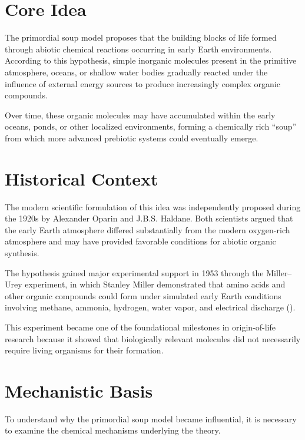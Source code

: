 \documentclass[
  oneside]{book}
\begin{document}
\section{Core Idea}\label{core-idea}

The primordial soup model proposes that the building blocks of life formed through abiotic chemical reactions occurring in early Earth environments. According to this hypothesis, simple inorganic molecules present in the primitive atmosphere, oceans, or shallow water bodies gradually reacted under the influence of external energy sources to produce increasingly complex organic compounds.

Over time, these organic molecules may have accumulated within the early oceans, ponds, or other localized environments, forming a chemically rich ``soup'' from which more advanced prebiotic systems could eventually emerge.

\section{Historical Context}\label{historical-context}

The modern scientific formulation of this idea was independently proposed during the 1920s by Alexander Oparin and J.B.S. Haldane. Both scientists argued that the early Earth atmosphere differed substantially from the modern oxygen-rich atmosphere and may have provided favorable conditions for abiotic organic synthesis.

The hypothesis gained major experimental support in 1953 through the Miller--Urey experiment, in which Stanley Miller demonstrated that amino acids and other organic compounds could form under simulated early Earth conditions involving methane, ammonia, hydrogen, water vapor, and electrical discharge ().

This experiment became one of the foundational milestones in origin-of-life research because it showed that biologically relevant molecules did not necessarily require living organisms for their formation.

\section{Mechanistic Basis}\label{mechanistic-basis}

To understand why the primordial soup model became influential, it is necessary to examine the chemical mechanisms underlying the theory.
\end{document}
